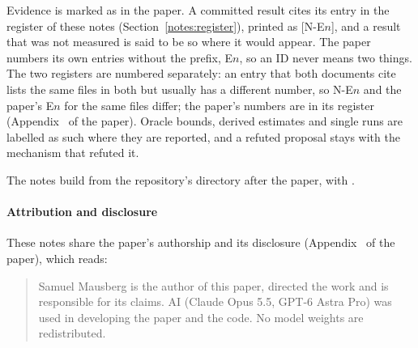 Evidence is marked as in the paper. A committed result cites its entry in the register of these notes (Section~\ref{notes:register}), printed as [N-E$n$], and a result that was not measured is said to be so where it would appear. The paper numbers its own entries without the prefix, E$n$, so an ID never means two things. The two registers are numbered separately: an entry that both documents cite lists the same files in both but usually has a different number, so N-E$n$ and the paper's E$n$ for the same files differ; the paper's numbers are in its register (Appendix~ of the paper). Oracle bounds, derived estimates and single runs are labelled as such where they are reported, and a refuted proposal stays with the mechanism that refuted it.

The notes build from the repository's  directory after the paper, with .

\paragraph{Attribution and disclosure} These notes share the paper's authorship and its disclosure (Appendix~ of the paper), which reads:
\begin{quote}
Samuel Mausberg is the author of this paper, directed the work and is responsible for its claims. AI (Claude Opus 5.5, GPT-6 Astra Pro) was used in developing the paper and the code. No model weights are redistributed.
\end{quote}
